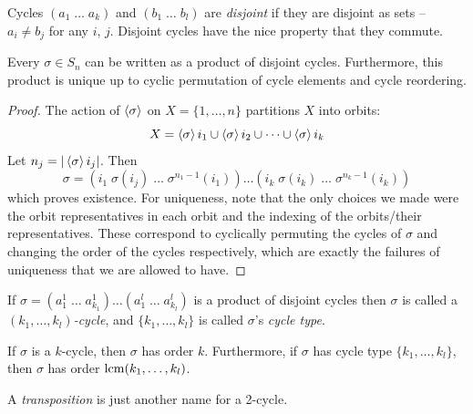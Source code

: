 \documentclass{../../template/note}
\begin{document}
    \begin{definition}
        Cycles \((a_1 \; \dots \; a_k)\) and \((b_1 \; \dots \; b_l)\) are \emph{disjoint} if they are disjoint as sets -- \(a_i \neq b_j\) for any \(i\), \(j\). Disjoint cycles have the nice property that they commute.
    \end{definition}
    
    \begin{theorem}
        Every \(\sigma \in S_n\) can be written as a product of disjoint cycles. Furthermore, this product is unique up to cyclic permutation of cycle elements and cycle reordering.
    \end{theorem}
    
    \begin{proof}
        The action of \(\left \langle \sigma \right \rangle\) on \(X = \{1, \dots, n\}\) partitions \(X\) into orbits:
        \[
            X = \left \langle \sigma \right \rangle i_1 \cup \left \langle \sigma \right \rangle i_2 \cup \dots \cup \left \langle \sigma \right \rangle i_k
        \]
        Let \(n_j = |\left \langle \sigma \right \rangle i_j|\). Then
        \[
            \sigma = (i_1 \; \sigma(i_j) \; \dots \; \sigma^{n_1-1}(i_1)) \dots (i_k \; \sigma(i_k) \; \dots \; \sigma^{n_k-1}(i_k))
        \]
        which proves existence. For uniqueness, note that the only choices we made were the orbit representatives in each orbit and the indexing of the orbits/their representatives. These correspond to cyclically permuting the cycles of \(\sigma\) and changing the order of the cycles respectively, which are exactly the failures of uniqueness that we are allowed to have.
    \end{proof}
    
    \begin{definition}
        If \(\sigma = (a_1^1 \; \dots \; a_{k_1}^1) \dots (a_1^l \; \dots \; a_{k_l}^l)\) is a product of disjoint cycles then \(\sigma\) is called a \emph{\((k_1, \dots, k_l)\)-cycle}, and \(\{k_1, \dots, k_l\}\) is called \(\sigma\)'s \emph{cycle type}.
    \end{definition}
    
    \begin{remark*}
        If \(\sigma\) is a \(k\)-cycle, then \(\sigma\) has order \(k\). Furthermore, if \(\sigma\) has cycle type \(\{k_1, \dots, k_l\}\), then \(\sigma\) has order \(\operatorname*{lcm}(k_1, \dots, k_l)\).
    \end{remark*}
    
    \begin{definition}
        A \emph{transposition} is just another name for a 2-cycle.
    \end{definition}
    
\end{document}
